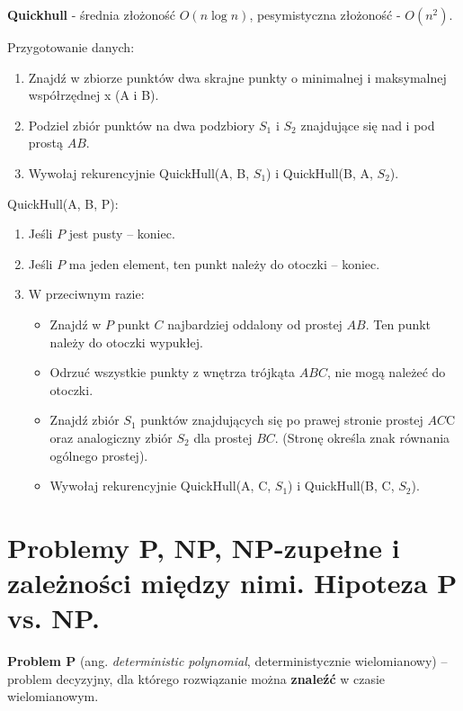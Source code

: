 \documentclass[12pt]{article}
\begin{document}
    \begin{definition}
        \textbf{Quickhull} - średnia złożoność $O(n \log n)$, pesymistyczna złożoność - $O(n^2)$.

        Przygotowanie danych:
        \begin{enumerate}
            \item Znajdź w zbiorze punktów dwa skrajne punkty o minimalnej i maksymalnej współrzędnej x (A i B).
            \item Podziel zbiór punktów na dwa podzbiory $S_1$ i $S_2$ znajdujące się nad i pod prostą $AB$.
            \item Wywołaj rekurencyjnie QuickHull(A, B, $S_1$) i QuickHull(B, A, $S_2$).
        \end{enumerate}

        QuickHull(A, B, P):
        \begin{enumerate}
            \item Jeśli $P$ jest pusty – koniec.
            \item Jeśli $P$ ma jeden element, ten punkt należy do otoczki – koniec.
            \item W przeciwnym razie:
            \begin{itemize}
                \item Znajdź w $P$ punkt $C$ najbardziej oddalony od prostej $AB$. Ten punkt należy do otoczki wypukłej.
                \item Odrzuć wszystkie punkty z wnętrza trójkąta $ABC$, nie mogą należeć do otoczki.
                \item Znajdź zbiór $S_1$ punktów znajdujących się po prawej stronie prostej $AC$C oraz analogiczny
                zbiór $S_2$ dla prostej $BC$. (Stronę określa znak równania ogólnego prostej).
                \item Wywołaj rekurencyjnie QuickHull(A, C, $S_1$) i QuickHull(B, C, $S_2$).
            \end{itemize}
        \end{enumerate}
    \end{definition}

    \newpage

    \section{Problemy P, NP, NP-zupełne i zależności między nimi. Hipoteza P vs. NP.}
    \begin{definition}
        \textbf{Problem P} (ang. \textit{deterministic polynomial}, deterministycznie wielomianowy) – problem decyzyjny,
        dla którego rozwiązanie można \textbf{znaleźć} w czasie wielomianowym.
    \end{definition}
\end{document}
